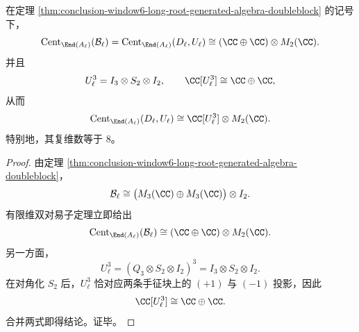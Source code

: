 \begin{corollary}[长根层对易子代数的闭式]\label{cor:conclusion-window6-long-root-commutant-closed}
在定理 \ref{thm:conclusion-window6-long-root-generated-algebra-doubleblock} 的记号下，
\[
\operatorname{Cent}_{\End(A_{\ell})}(\mathcal B_{\ell})
=
\operatorname{Cent}_{\End(A_{\ell})}(D_{\ell},U_{\ell})
\cong
(\CC\oplus \CC)\otimes M_2(\CC).
\]
并且
\[
U_{\ell}^3=I_3\otimes S_2\otimes I_2,
\qquad
\CC[U_{\ell}^3]\cong \CC\oplus \CC,
\]
从而
\[
\operatorname{Cent}_{\End(A_{\ell})}(D_{\ell},U_{\ell})
\cong
\CC[U_{\ell}^3]\otimes M_2(\CC).
\]
特别地，其复维数等于 \(8\)。
\end{corollary}
\begin{proof}
由定理 \ref{thm:conclusion-window6-long-root-generated-algebra-doubleblock}，
\[
\mathcal B_{\ell}\cong \bigl(M_3(\CC)\oplus M_3(\CC)\bigr)\otimes I_2.
\]
有限维双对易子定理立即给出
\[
\operatorname{Cent}_{\End(A_{\ell})}(\mathcal B_{\ell})
\cong
(\CC\oplus \CC)\otimes M_2(\CC).
\]
另一方面，
\[
U_{\ell}^3
=
(Q_3\otimes S_2\otimes I_2)^3
=
I_3\otimes S_2\otimes I_2.
\]
在对角化 \(S_2\) 后，\(U_{\ell}^3\) 恰对应两条手征块上的 \((+1)\) 与 \((-1)\) 投影，因此
\[
\CC[U_{\ell}^3]\cong \CC\oplus \CC.
\]
合并两式即得结论。证毕。
\end{proof}

